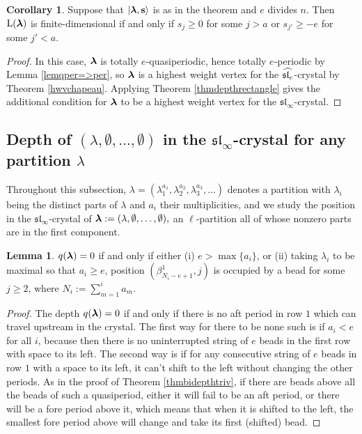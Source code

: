 \documentclass[12pt]{amsart}
\numberwithin{equation}{section}
\theoremstyle{definition}
\newtheorem{lemma}[equation]{Lemma}
\newtheorem{corollary}[equation]{Corollary}
\newcommand{\el}{\mathrm{L}}
\newcommand{\emp}{\emptyset}
\newcommand{\slinf}{\mathfrak{sl}_\infty}
\newcommand{\mbs}{\mathbf{s}}
\begin{document}
\begin{corollary} Suppose that $|\bla,\mbs\rangle$ is as in the theorem and $e$ divides $n$. Then $\el(\bla)$ is finite-dimensional if and only if $s_j\geq 0$ for some $j>a$ or $s_{j'}\geq -e$ for some $j'<a$.
\end{corollary}
\begin{proof} In this case, $\boldsymbol{\lambda}$ is totally $e$-quasiperiodic, hence totally $e$-periodic by Lemma \ref{lemqper=>per}, so $\boldsymbol{\lambda}$ is a highest weight vertex for the $\widehat{\mathfrak{sl}_e}$-crystal by Theorem \ref{hwvchapeau}. Applying Theorem \ref{thmdepthrectangle} gives the additional condition for $\boldsymbol{\lambda}$ to be a highest weight vertex for the $\slinf$-crystal.
\end{proof}

\subsection{Depth of $(\lambda,\emp,\dots,\emp)$ in the $\slinf$-crystal for any partition $\lambda$}
Throughout this subsection, $\lambda=(\lambda_1^{a_1},\lambda_2^{a_2},\lambda_3^{a_3},\dots)$ denotes a partition with $\lambda_i$ being the distinct parts of $\lambda$ and $a_i$ their multiplicities, and we study the position in the $\slinf$-crystal of $\bla:=(\lambda,\emp,\dots,\emp),$ an $\ell$-partition all of whose nonzero parts are in the first component.

\begin{lemma}\label{lemmalambda1} $q(\boldsymbol{\lambda})=0$ if and only if  
either (i) $e>\max\{a_i\}$, or (ii) taking $\lambda_i$ to be maximal so that $a_i\geq e$, position $(\beta_{N_i-e+1}^1,j)$ is occupied by a bead for some $j\geq 2$, where $N_i:=\sum_{m=1}^ia_m$. 
\end{lemma}

\begin{proof}
The depth $q(\boldsymbol{\lambda})=0$ if and only if there is no aft period in row $1$ which can travel upstream in the crystal. The first way for there to be none such is if $a_i<e$ for all $i$, because then there is no uninterrupted string of $e$ beads in the first row with space to its left. The second way is if for any consecutive string of $e$ beads in row $1$ with a space to its left, it can't shift to the left without changing the other periods. As in the proof of Theorem \ref{thmbidepthtriv}, if there are beads above all the beads of such a quasiperiod, either it will fail to be an aft period, or there will be a fore period above it, which means that when it is shifted to the left, the smallest fore period above will change and take its first (shifted) bead. 
\end{proof}
 
\end{document}
